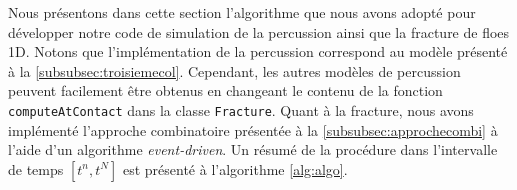 Nous présentons dans cette section l'algorithme que nous avons adopté pour développer notre code de simulation de la percussion ainsi que la fracture de floes 1D. Notons que l'implémentation de la percussion correspond au modèle présenté à la \cref{subsubsec:troisiemecol}. Cependant, les autres modèles de percussion peuvent facilement être obtenus en changeant le contenu de la fonction \texttt{computeAtContact} dans la classe \texttt{Fracture}. Quant à la fracture, nous avons implémenté l'approche combinatoire présentée à la \cref{subsubsec:approchecombi} à l'aide d'un algorithme \emph{event-driven}. Un résumé de la procédure dans l'intervalle de temps $[t^n, t^{N}]$ est présenté à l'algorithme \ref{alg:algo}.

